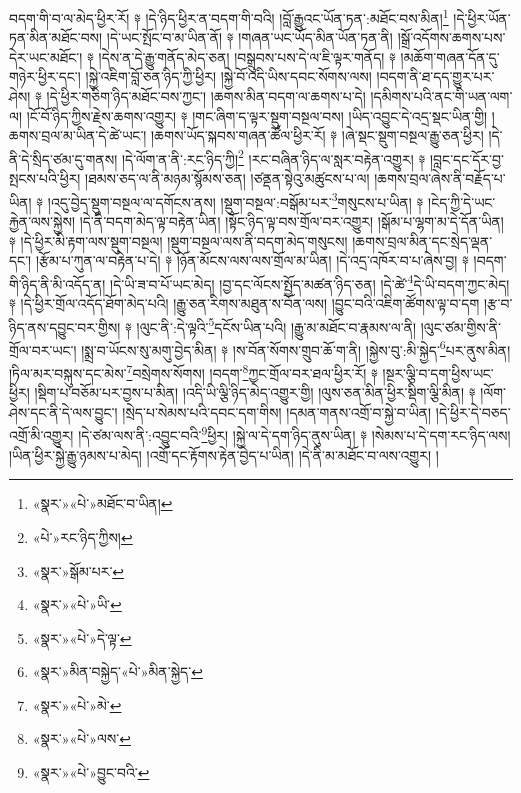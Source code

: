བདག་གི་བ་ལ་མེད་ཕྱིར་རོ། ༈ །དེ་ཉིད་ཕྱིར་ན་བདག་གི་བའི། །བློ་རྒྱུའང་ཡོན་ཏན་:མཐོང་བས་མིན།\footnote{«སྣར་»«པེ་»མཐོང་བ་ཡིན།} །དེ་ཕྱིར་ཡོན་ཏན་མིན་མཐོང་བས། །དེ་ཡང་སྤོང་བ་མ་ཡིན་ནོ། ༈ །གཞན་ཡང་ཡོད་མིན་ཡོན་ཏན་ནི། །སྒྲོ་འདོགས་ཆགས་པས་དེར་ཡང་མཐོང་། ༈ །དེས་ན་དེ་རྒྱུ་གནོད་མེད་ཅན། །བསྒྲུབས་པས་དེ་ལ་ཇི་ལྟར་གནོད། ༈ །མཆོག་གཞན་དོན་དུ་གཉེར་ཕྱིར་དང་། །སྐྱེ་འཇིག་བློ་ཅན་ཉིད་ཀྱི་ཕྱིར། །སྐྱེ་བོ་འདི་ཡིས་དབང་སོགས་ལས། །བདག་ནི་ཐ་དད་གྱུར་པར་ཤེས། ༈ །དེ་ཕྱིར་གཅིག་ཉིད་མཐོང་བས་ཀྱང་། །ཆགས་མིན་བདག་ལ་ཆགས་པ་དེ། །དམིགས་པའི་ནང་གི་ཡན་ལག་ལ། །ངོ་བོ་ཉིད་ཀྱིས་རྗེས་ཆགས་འགྱུར། ༈ །གང་ཞིག་ད་ལྟར་སྡུག་བསྔལ་བས། །ཡིད་འབྱུང་དེ་འདྲ་སྡང་ཡིན་གྱི། །ཆགས་བྲལ་མ་ཡིན་དེ་ཚེ་ཡང་། །ཆགས་ཡོད་སྐབས་གཞན་ཚོལ་ཕྱིར་རོ། ༈ །ཞེ་སྡང་སྡུག་བསྔལ་རྒྱུ་ཅན་ཕྱིར། །དེ་ནི་དེ་སྲིད་ཙམ་དུ་གནས། །དེ་ལོག་ན་ནི་:རང་ཉིད་ཀྱི།\footnote{«པེ་»རང་ཉིད་ཀྱིས།} །རང་བཞིན་ཉིད་ལ་སླར་བརྟེན་འགྱུར། ༈ །བླང་དང་དོར་བྱ་སྤངས་པའི་ཕྱིར། །ཐམས་ཅད་ལ་ནི་མཉམ་སྙོམས་ཅན། །ཙནྡན་སྟེའུ་མཚུངས་པ་ལ། །ཆགས་བྲལ་ཞེས་ནི་བརྗོད་པ་ཡིན། ༈ །འདུ་བྱེད་སྡུག་བསྔལ་ལ་དགོངས་ནས། །སྡུག་བསྔལ་:བསྒོམ་པར་\footnote{«སྣར་»སྒོམ་པར་}གསུངས་པ་ཡིན། ༈ །ངེད་ཀྱི་དེ་ཡང་རྐྱེན་ལས་སྐྱེས། །དེ་ནི་བདག་མེད་ལྟ་བརྟེན་ཡིན། །སྟོང་ཉིད་ལྟ་བས་གྲོལ་བར་འགྱུར། །སྒོམ་པ་ལྷག་མ་དེ་དོན་ཡིན། ༈ །དེ་ཕྱིར་མི་རྟག་ལས་སྡུག་བསྔལ། །སྡུག་བསྔལ་ལས་ནི་བདག་མེད་གསུངས། །ཆགས་བྲལ་མིན་དང་སྲེད་ལྡན་དང་། །རྩོམ་པ་ཀུན་ལ་བརྟེན་པ་དེ། ༈ །ཉོན་མོངས་ལས་ལས་གྲོལ་མ་ཡིན། །དེ་འདྲ་འཁོར་བ་པ་ཞེས་བྱ། ༈ །བདག་གི་ཉིད་ནི་མི་འདོད་ན། །དེ་ཡི་ཟ་བ་པོ་ཡང་མེད། །བྱ་དང་ལོངས་སྤྱོད་མཚན་ཉིད་ཅན། །དེ་ཚེ་\footnote{«སྣར་»«པེ་»ཡི་}དེ་ཡི་བདག་ཀྱང་མེད། ༈ །དེ་ཕྱིར་གྲོལ་འདོད་ཐོག་མེད་པའི། །རྒྱུ་ཅན་རིགས་མཐུན་ས་བོན་ལས། །བྱུང་བའི་འཇིག་ཚོགས་ལྟ་བ་དག །རྩ་བ་ཉིད་ནས་དབྱུང་བར་གྱིས། ༈ །ལུང་ནི་:དེ་ལྟའི་\footnote{«སྣར་»«པེ་»དེ་ལྟ་}དངོས་ཡིན་པའི། །རྒྱུ་མ་མཐོང་བ་རྣམས་ལ་ནི། །ལུང་ཙམ་གྱིས་ནི་གྲོལ་བར་ཡང་། །སྨྲ་བ་ཡོངས་སུ་མགུ་བྱེད་མིན། ༈ །ས་བོན་སོགས་གྲུབ་ཆོ་ག་ནི། །སྐྱེས་བུ་:མི་སྐྱེད་\footnote{«སྣར་»མིན་བསྐྱེད་«པེ་»མིན་སྐྱེད་}པར་ནུས་མིན། །ཏིལ་མར་བསྐུས་དང་མེས་\footnote{«སྣར་»«པེ་»མེ་}བསྲེགས་སོགས། །བདག་\footnote{«སྣར་»«པེ་»ལས་}ཀྱང་གྲོལ་བར་ཐལ་ཕྱིར་རོ། ༈ །སྔར་ལྕི་བ་དག་ཕྱིས་ཡང་ཕྱིར། །སྡིག་པ་བཅོམ་པར་བྱས་པ་མིན། །འདི་ཡི་ལྕི་ཉིད་མེད་འགྱུར་གྱི། །ལུས་ཅན་མིན་ཕྱིར་སྡིག་ལྕི་མིན། ༈ །ལོག་ཤེས་དང་ནི་དེ་ལས་བྱུང་། །སྲེད་པ་སེམས་པའི་དབང་དག་གིས། །དམན་གནས་འགྲོ་བ་སྐྱེ་བ་ཡིན། །དེ་ཕྱིར་དེ་བཅད་འགྲོ་མི་འགྱུར། །དེ་ཙམ་ལས་ནི་:འབྱུང་བའི་\footnote{«སྣར་»«པེ་»བྱུང་བའི་}ཕྱིར། །སྐྱེ་ལ་དེ་དག་ཉིད་ནུས་ཡིན། ༈ །སེམས་པ་དེ་དག་རང་ཉིད་ལས། །ཡིན་ཕྱིར་སྐྱེ་རྒྱུ་ཉམས་པ་མེད། །འགྲོ་དང་རྟོགས་རྟེན་བྱེད་པ་ཡིན། །དེ་ནི་མ་མཐོང་བ་ལས་འགྱུར། །
